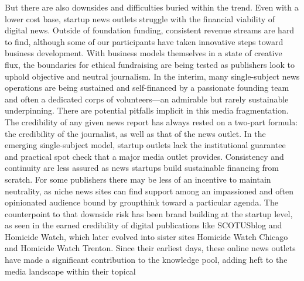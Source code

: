 But there are also downsides and difficulties buried within the trend. Even
with a lower cost base, startup news outlets struggle with the financial viability
of digital news. Outside of foundation funding, consistent revenue
streams are hard to find, although some of our participants have taken innovative
steps toward business development. With business models themselves
in a state of creative flux, the boundaries for ethical fundraising are
being tested as publishers look to uphold objective and neutral journalism.
In the interim, many single-subject news operations are being sustained and
self-financed by a passionate founding team and often a dedicated corps of
volunteers—an admirable but rarely sustainable underpinning.
There are potential pitfalls implicit in this media fragmentation. The credibility
of any given news report has always rested on a two-part formula:
the credibility of the journalist, as well as that of the news outlet. In the
emerging single-subject model, startup outlets lack the institutional guarantee
and practical spot check that a major media outlet provides. Consistency
and continuity are less assured as news startups build sustainable
financing from scratch. For some publishers there may be less of an incentive
to maintain neutrality, as niche news sites can find support among an
impassioned and often opinionated audience bound by groupthink toward
a particular agenda.
The counterpoint to that downside risk has been brand building at the
startup level, as seen in the earned credibility of digital publications like
SCOTUSblog and Homicide Watch, which later evolved into sister sites
Homicide Watch Chicago and Homicide Watch Trenton. Since their earliest
days, these online news outlets have made a significant contribution to
the knowledge pool, adding heft to the media landscape within their topical

